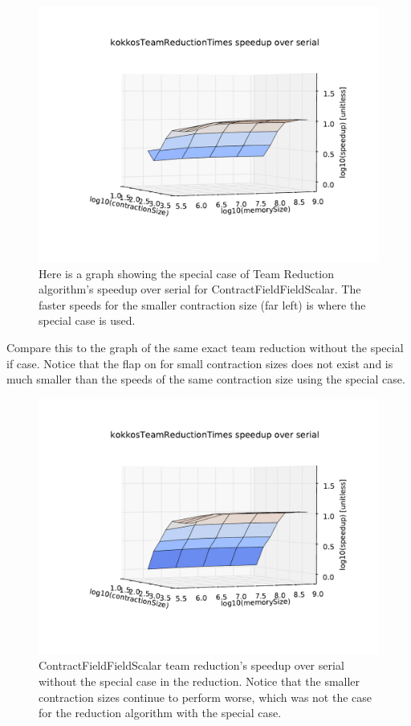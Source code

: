 \begin{figure}[!ht]
    \centering
    \includegraphics[scale = .8]{kokkosCFFSTeamReductionSpecialCase.pdf}
    \caption{Here is a graph showing the special case of Team Reduction algorithm's speedup over serial for ContractFieldFieldScalar. The faster speeds for the smaller contraction size (far left) is where the special case is used. }
\end{figure}

Compare this to the graph of the same exact team reduction without the special if case. Notice that the flap on for small contraction sizes does not exist and is much smaller than the speeds of the same contraction size using the special case.

\begin{figure}[!ht]
    \centering
    \includegraphics[scale = .8]{kokkosCFFSTeamReductionNoSpecialCase}
    \caption{ContractFieldFieldScalar team reduction's speedup over serial without the special case in the reduction. Notice that the smaller contraction sizes continue to perform worse, which was not the case for the reduction algorithm with the special case.}
\end{figure}

